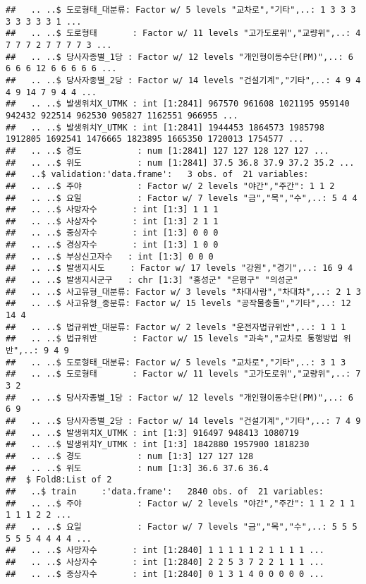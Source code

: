 \documentclass[]{article}
\begin{document}
\begin{verbatim}
##   .. ..$ 도로형태_대분류: Factor w/ 5 levels "교차로","기타",..: 1 3 3 3 3 3 3 3 3 1 ...
##   .. ..$ 도로형태       : Factor w/ 11 levels "고가도로위","교량위",..: 4 7 7 7 2 7 7 7 7 3 ...
##   .. ..$ 당사자종별_1당 : Factor w/ 12 levels "개인형이동수단(PM)",..: 6 6 6 6 12 6 6 6 6 6 ...
##   .. ..$ 당사자종별_2당 : Factor w/ 14 levels "건설기계","기타",..: 4 9 4 4 9 14 7 9 4 4 ...
##   .. ..$ 발생위치X_UTMK : int [1:2841] 967570 961608 1021195 959140 942432 922514 962530 905827 1162551 966955 ...
##   .. ..$ 발생위치Y_UTMK : int [1:2841] 1944453 1864573 1985798 1912805 1692541 1476665 1823895 1665350 1720013 1754577 ...
##   .. ..$ 경도           : num [1:2841] 127 127 128 127 127 ...
##   .. ..$ 위도           : num [1:2841] 37.5 36.8 37.9 37.2 35.2 ...
##   ..$ validation:'data.frame':   3 obs. of  21 variables:
##   .. ..$ 주야           : Factor w/ 2 levels "야간","주간": 1 1 2
##   .. ..$ 요일           : Factor w/ 7 levels "금","목","수",..: 5 4 4
##   .. ..$ 사망자수       : int [1:3] 1 1 1
##   .. ..$ 사상자수       : int [1:3] 2 1 1
##   .. ..$ 중상자수       : int [1:3] 0 0 0
##   .. ..$ 경상자수       : int [1:3] 1 0 0
##   .. ..$ 부상신고자수   : int [1:3] 0 0 0
##   .. ..$ 발생지시도     : Factor w/ 17 levels "강원","경기",..: 16 9 4
##   .. ..$ 발생지시군구   : chr [1:3] "홍성군" "은평구" "의성군"
##   .. ..$ 사고유형_대분류: Factor w/ 3 levels "차대사람","차대차",..: 2 1 3
##   .. ..$ 사고유형_중분류: Factor w/ 15 levels "공작물충돌","기타",..: 12 14 4
##   .. ..$ 법규위반_대분류: Factor w/ 2 levels "운전자법규위반",..: 1 1 1
##   .. ..$ 법규위반       : Factor w/ 15 levels "과속","교차로 통행방법 위반",..: 9 4 9
##   .. ..$ 도로형태_대분류: Factor w/ 5 levels "교차로","기타",..: 3 1 3
##   .. ..$ 도로형태       : Factor w/ 11 levels "고가도로위","교량위",..: 7 3 2
##   .. ..$ 당사자종별_1당 : Factor w/ 12 levels "개인형이동수단(PM)",..: 6 6 9
##   .. ..$ 당사자종별_2당 : Factor w/ 14 levels "건설기계","기타",..: 7 4 9
##   .. ..$ 발생위치X_UTMK : int [1:3] 916497 948413 1080719
##   .. ..$ 발생위치Y_UTMK : int [1:3] 1842880 1957900 1818230
##   .. ..$ 경도           : num [1:3] 127 127 128
##   .. ..$ 위도           : num [1:3] 36.6 37.6 36.4
##  $ Fold8:List of 2
##   ..$ train     :'data.frame':   2840 obs. of  21 variables:
##   .. ..$ 주야           : Factor w/ 2 levels "야간","주간": 1 1 2 1 1 1 1 1 2 2 ...
##   .. ..$ 요일           : Factor w/ 7 levels "금","목","수",..: 5 5 5 5 5 5 4 4 4 4 ...
##   .. ..$ 사망자수       : int [1:2840] 1 1 1 1 1 2 1 1 1 1 ...
##   .. ..$ 사상자수       : int [1:2840] 2 2 5 3 7 2 2 1 1 1 ...
##   .. ..$ 중상자수       : int [1:2840] 0 1 3 1 4 0 0 0 0 0 ...

\end{verbatim}
\end{document}
